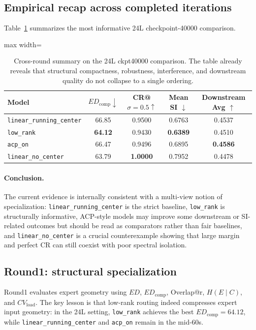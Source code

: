 \documentclass[11pt]{article}
\newcommand{\tablesize}{\footnotesize}
\begin{document}
\subsection{Empirical recap across completed iterations}
Table~\ref{tab:24l-summary} summarizes the most informative 24L checkpoint-40000 comparison.

\begin{table}[H]
\centering
\tablesize
\begin{adjustbox}{max width=\linewidth}
\begin{tabular}{lcccc}
\toprule
Model & $ED_{\mathrm{comp}} \downarrow$ & CR@$\sigma{=}0.5 \uparrow$ & Mean SI $\downarrow$ & Downstream Avg $\uparrow$ \\
\midrule
\texttt{linear\_running\_center} & 66.85 & 0.9500 & 0.6763 & 0.4537 \\
\texttt{low\_rank} & \textbf{64.12} & 0.9430 & \textbf{0.6389} & 0.4510 \\
\texttt{acp\_on} & 66.47 & 0.9496 & 0.6895 & \textbf{0.4586} \\
\texttt{linear\_no\_center} & 63.79 & \textbf{1.0000} & 0.7952 & 0.4478 \\
\bottomrule
\end{tabular}
\end{adjustbox}
\caption{Cross-round summary on the 24L ckpt40000 comparison. The table already reveals that structural compactness, robustness, interference, and downstream quality do not collapse to a single ordering.}
\label{tab:24l-summary}
\end{table}

\paragraph{Conclusion.} The current evidence is internally consistent with a multi-view notion of specialization: \texttt{linear\_running\_center} is the strict baseline, \texttt{low\_rank} is structurally informative, ACP-style models may improve some downstream or SI-related outcomes but should be read as comparators rather than fair baselines, and \texttt{linear\_no\_center} is a crucial counterexample showing that large margin and perfect CR can still coexist with poor spectral isolation.

\subsection{Round1: structural specialization}
Round1 evaluates expert geometry using $ED$, $ED_{\mathrm{comp}}$, Overlap@r, $H(E\mid C)$, and $CV_{\mathrm{load}}$. The key lesson is that low-rank routing indeed compresses expert input geometry: in the 24L setting, \texttt{low\_rank} achieves the best $ED_{\mathrm{comp}}=64.12$, while \texttt{linear\_running\_center} and \texttt{acp\_on} remain in the mid-60s.
\end{document}
